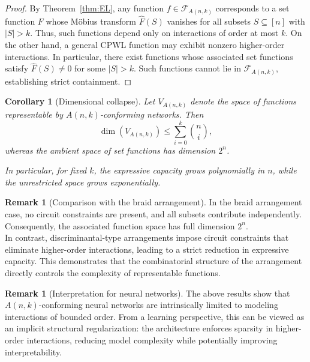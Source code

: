 \documentclass{amsart}
\newtheorem{corollary}[theorem]{Corollary}
\theoremstyle{definition}
\newtheorem{remark}[theorem]{Remark}
\begin{document}
\begin{proof}
By Theorem~\ref{thm:EL}, any function $f \in \mathcal{F}_{A(n,k)}$ corresponds to a set function $F$ whose Möbius transform $\widehat{F}(S)$ vanishes for all subsets $S \subseteq [n]$ with $|S| > k$. Thus, such functions depend only on interactions of order at most $k$. On the other hand, a general CPWL function may exhibit nonzero higher-order interactions. In particular, there exist functions whose associated set functions satisfy $\widehat{F}(S) \neq 0$ for some $|S| > k$. Such functions cannot lie in $\mathcal{F}_{A(n,k)}$, establishing strict containment.
\end{proof}

\begin{corollary}[Dimensional collapse]
Let $V_{A(n,k)}$ denote the space of functions representable by $A(n,k)$-conforming networks. Then
$$
\dim(V_{A(n,k)}) \le \sum_{i=0}^k \binom{n}{i},
$$
whereas the ambient space of set functions has dimension $2^n$.

In particular, for fixed $k$, the expressive capacity grows polynomially in $n$, while the unrestricted space grows exponentially.
\end{corollary}

\begin{remark}[Comparison with the braid arrangement]
In the braid arrangement case, no circuit constraints are present, and all subsets contribute independently. Consequently, the associated function space has full dimension $2^n$.\\
\noindent
In contrast, discriminantal-type arrangements impose circuit constraints that eliminate higher-order interactions, leading to a strict reduction in expressive capacity. This demonstrates that the combinatorial structure of the arrangement directly controls the complexity of representable functions.
\end{remark}

\begin{remark}[Interpretation for neural networks]
The above results show that $A(n,k)$-conforming neural networks are intrinsically limited to modeling interactions of bounded order. From a learning perspective, this can be viewed as an implicit structural regularization: the architecture enforces sparsity in higher-order interactions, reducing model complexity while potentially improving interpretability.
\end{remark}
\end{document}
